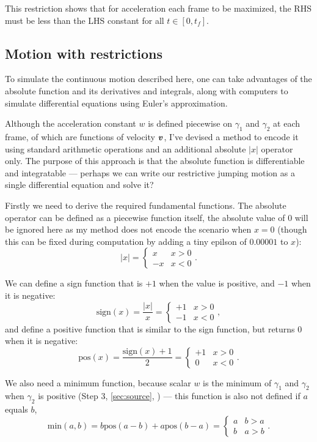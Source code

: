 This restriction shows that for acceleration each frame to be maximized, the RHS must be less than the LHS constant for all $t \in [0, t_f]$.

\subsection{Motion with restrictions}
To simulate the continuous motion described here, one can take advantages of the absolute function and its derivatives and integrals, along with computers to simulate differential equations using Euler's approximation.

Although the acceleration constant $w$ is defined piecewise on $\gamma_1$ and $\gamma_2$ at each frame, of which are functions of velocity $\boldsymbol{v}$, I've devised a method to encode it using standard arithmetic operations and an additional absolute $|x|$ operator only. The purpose of this approach is that the absolute function is differentiable and integratable --- perhaps we can write our restrictive jumping motion as a single differential equation and solve it?

Firstly we need to derive the required fundamental functions. The absolute operator can be defined as a piecewise function itself, the absolute value of $0$ will be ignored here as my method does not encode the scenario when $x=0$ (though this can be fixed during computation by adding a tiny epilson of $0.00001$ to $x$):
\[
    |x| = \begin{cases}
        x & x > 0\\
        -x & x < 0
    \end{cases}.
\]

We can define a sign function that is $+1$ when the value is positive, and $-1$ when it is negative:
\[
    \text{sign}(x) = \frac{|x|}{x} = \begin{cases}
        +1 & x > 0\\
        -1 & x < 0
    \end{cases},
\]
and define a positive function that is similar to the sign function, but returns $0$ when it is negative:
\[
    \text{pos}(x) = \frac{\text{sign}(x) + 1}{2} = \begin{cases}
        +1 & x > 0\\
        0 & x < 0
    \end{cases}.
\]

We also need a minimum function, because scalar $w$ is the minimum of $\gamma_1$ and $\gamma_2$ when $\gamma_2$ is positive (Step 3, \autoref{sec:source}, ) --- this function is also not defined if $a$ equals $b$,
\[
    \text{min}(a, b) = b \text{pos}(a - b) + a \text{pos}(b - a) = \begin{cases}
        a & b > a\\
        b & a > b
    \end{cases}.
\]

